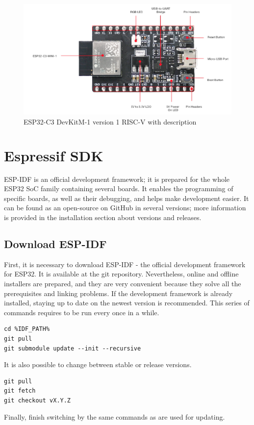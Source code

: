 \documentclass{ctuthesis}
\begin{document}
\begin{figure}[htb]
 \includegraphics[width=1\textwidth]{images/esp32-c3-devkitm-1-v1-annotated.pdf}
 \caption{ESP32-C3 DevKitM-1 version 1 RISC-V with description\cite{esp32c3-devkit}}
\end{figure}

 \section{Espressif SDK}
  ESP-IDF is an official development framework\cite{esp-idf}; it is prepared for the whole ESP32 SoC family containing several boards. It enables the programming of specific boards, as well as their debugging, and helps make development easier. It can be found as an open-source on GitHub in several versions; more information is provided in the installation section about versions and releases\cite{otrees}.
  
 \subsection{Download ESP-IDF}
 First, it is necessary to download ESP-IDF \cite{esp-idf-guide} - the official development framework for ESP32. It is available at the git repository. Nevertheless, online and offline installers are prepared, and they are very convenient because they solve all the prerequisites and linking problems\cite{esp-idf-intallers}.
 If the development framework is already installed, staying up to date on the newest version is recommended. This series of commands requires to be run every once in a while.
\begin{verbatim}
cd %IDF_PATH%
git pull
git submodule update --init --recursive
\end{verbatim}
 It is also possible to change between stable or release versions.
\begin{verbatim}
git pull
git fetch
git checkout vX.Y.Z
\end{verbatim}
 Finally, finish switching by the same commands as are used for updating.
 
\end{document}
